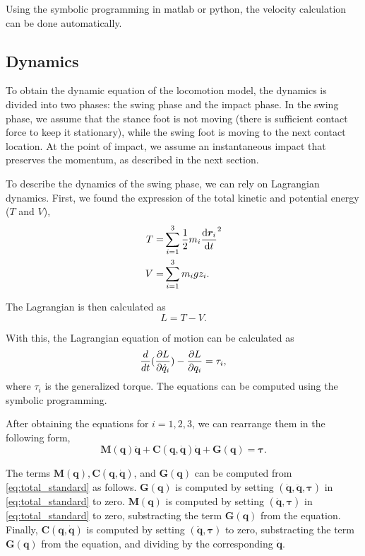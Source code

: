 Using the symbolic programming in matlab or python, the velocity calculation can be done automatically. 

\subsection{Dynamics}
\label{sec:dyn}
To obtain the dynamic equation of the locomotion model, the dynamics is divided into two phases: the swing phase and the impact phase. In the swing phase, we assume that the stance foot is not moving (there is sufficient contact force to keep it stationary), while the swing foot is moving to the next contact location. At the point of impact, we assume an instantaneous impact that preserves the momentum, as described in the next section. 

To describe the dynamics of the swing phase, we can rely on Lagrangian dynamics. First, we found the expression of the total kinetic and potential energy ($T$ and $V$),
\begin{align}
T = & \sum_{i=1}^{3} \frac{1}{2} m_i \dv{\bm{r}_i}{t}^2 \\
V = & \sum_{i=1}^{3} m_i g z_i.
\end{align}

The Lagrangian is then calculated as 
\begin{equation}
L = T - V . 
\end{equation}

With this, the Lagrangian equation of motion can be calculated as
\begin{equation}
\frac{d}{dt} (\pdv{L}{\dot{q}_i}) - \pdv{L}{q_i} = \tau_i,
\label{eq:total_lagrange}
\end{equation}
where $\tau_i$ is the generalized torque. The equations can be computed using the symbolic programming. 

After obtaining the equations for $i = 1, 2, 3$, we can rearrange them in the following form, 
\begin{equation}
\bm{M}(\bm{q})\ddot{\bm{q}} + \bm{C}({\bm{q}},\dot{\bm{q}})\dot{\bm{q}} + \bm{G}({\bm{q}}) = \bm{\tau}. 
\label{eq:total_standard}
\end{equation}

The terms $\bm{M}(\bm{q}), \bm{C}({\bm{q}},\dot{\bm{q}})$, and $\bm{G}({\bm{q}})$ can be computed from \eqref{eq:total_standard} as follows. $\bm{G}(\bm{q})$ is computed by setting $(\dot{\bm{q}}, \ddot{\bm{q}}, \bm{\tau})$ in \eqref{eq:total_standard} to zero. 
$\bm{M}(\bm{q})$ is computed by setting $(\dot{\bm{q}},\bm{\tau})$ in \eqref{eq:total_standard} to zero, substracting the term $\bm{G}(\bm{q})$ from the equation. Finally, $\bm{C}(\bm{q}, \dot{\bm{q}})$ is computed by setting 
$(\ddot{\bm{q}}, \bm{\tau})$ to zero, substracting the term $\bm{G}(\bm{q})$ from the equation, and dividing by the corresponding $\dot{\bm{q}}$. 

